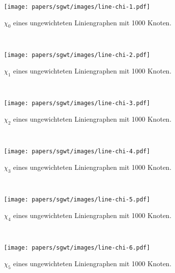 \begin{figure}
    \centering
    \begin{minipage}[b]{0.49\textwidth}
        \texttt{[image: papers/sgwt/images/line-chi-1.pdf]}
        \vspace{-45pt}
        \caption{$\chi_0$ eines ungewichteten Liniengraphen mit 1000 
        Knoten.}
        \label{fig:sgwt:chi:line0}
    \end{minipage}
    ~
    \begin{minipage}[b]{0.49\textwidth}
        \texttt{[image: papers/sgwt/images/line-chi-2.pdf]}
        \vspace{-45pt}
        \caption{$\chi_1$ eines ungewichteten Liniengraphen mit 1000 
        Knoten.}
        \label{fig:sgwt:chi:line1}
    \end{minipage}
    ~
    \begin{minipage}[b]{0.49\textwidth}
        \texttt{[image: papers/sgwt/images/line-chi-3.pdf]}
        \vspace{-45pt}
        \caption{$\chi_2$ eines ungewichteten Liniengraphen mit 1000 
        Knoten.}
        \label{fig:sgwt:chi:line2}
    \end{minipage}
    ~
    \begin{minipage}[b]{0.49\textwidth}
        \texttt{[image: papers/sgwt/images/line-chi-4.pdf]}
        \vspace{-45pt}
        \caption{$\chi_3$ eines ungewichteten Liniengraphen mit 1000 
        Knoten.}
        \label{fig:sgwt:chi:line3}
    \end{minipage}
    ~
    \begin{minipage}[b]{0.49\textwidth}
        \texttt{[image: papers/sgwt/images/line-chi-5.pdf]}
        \vspace{-45pt}
        \caption{$\chi_4$ eines ungewichteten Liniengraphen mit 1000 
        Knoten.}
        \label{fig:sgwt:chi:line4}
    \end{minipage}
    ~
    \begin{minipage}[b]{0.49\textwidth}
        \texttt{[image: papers/sgwt/images/line-chi-6.pdf]}
        \vspace{-45pt}
        \caption{$\chi_5$ eines ungewichteten Liniengraphen mit 1000 
        Knoten.}
        \label{fig:sgwt:chi:line5}
    \end{minipage}
\end{figure}
